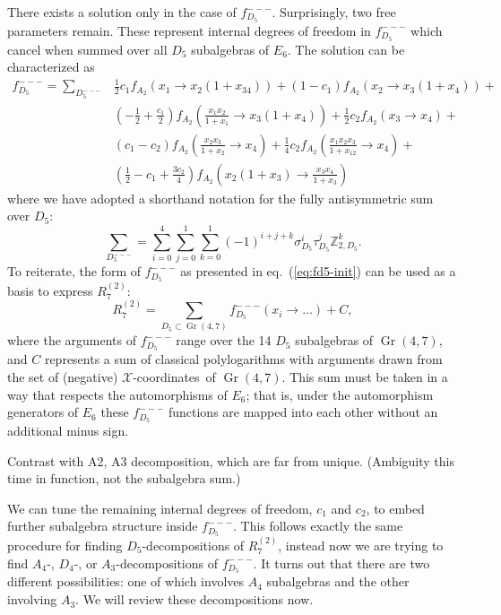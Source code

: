 \documentclass[11pt]{article}
\DeclareMathOperator{\Gr}{Gr}
\def\nl{\nonumber\\}
\def\xcoords{$\mathcal{X}$-coordinates}
\begin{document}
There exists a solution only in the case of $f_{D_5}^{---}$. Surprisingly, two free parameters remain. These represent internal degrees of freedom in $f_{D_5}^{---}$ which cancel when summed over all $D_5$ subalgebras of $E_6$. The solution can be characterized as 
\begin{align}\label{eq:fd5-init}
f_{D_5}^{---} = \sum_{D_5^{---}}
	&\frac{1}{2} c_1 f_{A_2}\left(x_1\to x_2 \left(1+x_{34}\right)\right)+
	\left(1-c_1\right) f_{A_2}\left(x_2\to x_3 \left(1+x_4\right)\right)+\nl
	&\left(-\frac{1}{2}+\frac{c_1}{2}\right) f_{A_2}\left(\frac{x_1 x_2}{1+x_1}\to x_3 \left(1+x_4\right)\right)+
	\frac{1}{2} c_2 f_{A_2}\left(x_3\to x_4\right)+\nl
	&\left(c_1-c_2\right) f_{A_2}\left(\frac{x_2 x_3}{1+x_2}\to x_4\right)+
	\frac{1}{4} c_2 f_{A_2}\left(\frac{x_1 x_2 x_3}{1+x_{12}}\to x_4\right)+\nl
	&\left(\frac{1}{2}-c_1+\frac{3 c_2}{4}\right) f_{A_2}\left(x_2 \left(1+x_3\right)\to \frac{x_3 x_4}{1+x_3}\right)
\end{align}
where we have adopted a shorthand notation for the fully antisymmetric sum over $D_5$:
\begin{equation}
	\sum_{D_5^{---}} = \sum_{i=0}^4\sum_{j=0}^1\sum_{k=0}^1 (-1)^{i+j+k} \sigma_{D_5}^i\tau_{D_5}^j\mathbb{Z}_{2,D_5}^k.
\end{equation}
To reiterate, the form of $f_{D_5}^{---}$ as presented in eq.~(\ref{eq:fd5-init}) can be used as a basis to express $R^{(2)}_7$:
\begin{equation}
	R^{(2)}_7 = \sum_{D_5\subset \Gr(4,7)} f_{D_5}^{---}(x_i \to \ldots) + C,
\end{equation}
where the arguments of $f_{D_5}^{---}$ range over the 14 $D_5$ subalgebras of $\Gr(4,7)$, and $C$ represents a sum of classical polylogarithms with arguments drawn from the set of (negative) \xcoords\ of $\Gr(4,7)$. This sum must be taken in a way that respects the automorphisms of $E_6$; that is, under the automorphism generators of $E_6$ these $f_{D_5}^{---}$ functions are mapped into each other without an additional minus sign.

Contrast with A2, A3 decomposition, which are far from unique. (Ambiguity this time in function, not the subalgebra sum.)

We can tune the remaining internal degrees of freedom, $c_1$ and $c_2$, to embed further subalgebra structure inside $f_{D_5}^{---}$. This follows exactly the same procedure for finding $D_5$-decompositions of $R^{(2)}_7$, instead now we are trying to find $A_4$-, $D_4$-, or $A_3$-decompositions of $f_{D_5}^{---}$. It turns out that there are two different possibilities: one of which involves $A_4$ subalgebras and the other involving $A_3$. We will review these decompositions now.
\end{document}
